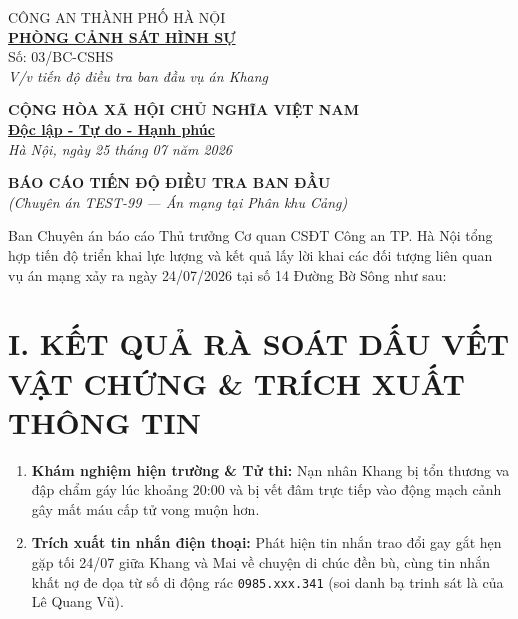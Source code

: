 \documentclass[12pt,a4paper]{article}
\begin{document}
\noindent
\begin{minipage}[t]{0.45\textwidth}
    \begin{center}
        \small
        CÔNG AN THÀNH PHỐ HÀ NỘI\\
        \textbf{\underline{PHÒNG CẢNH SÁT HÌNH SỰ}}\\[0.1cm]
        Số: 03/BC-CSHS\\
        \textit{V/v tiến độ điều tra ban đầu vụ án Khang}
    \end{center}
\end{minipage}
\hfill
\begin{minipage}[t]{0.52\textwidth}
    \begin{center}
        \small
        \textbf{CỘNG HÒA XÃ HỘI CHỦ NGHĨA VIỆT NAM}\\
        \textbf{\underline{Độc lập - Tự do - Hạnh phúc}}\\[0.1cm]
        \textit{Hà Nội, ngày 25 tháng 07 năm 2026}
    \end{center}
\end{minipage}

\vspace{0.6cm}

\begin{center}
    \textbf{\large BÁO CÁO TIẾN ĐỘ ĐIỀU TRA BAN ĐẦU}\\
    \textit{(Chuyên án TEST-99 — Án mạng tại Phân khu Cảng)}
\end{center}

\vspace{0.3cm}

\noindent Ban Chuyên án báo cáo Thủ trưởng Cơ quan CSĐT Công an TP. Hà Nội tổng hợp tiến độ triển khai lực lượng và kết quả lấy lời khai các đối tượng liên quan vụ án mạng xảy ra ngày 24/07/2026 tại số 14 Đường Bờ Sông như sau:

\section*{I. KẾT QUẢ RÀ SOÁT DẤU VẾT VẬT CHỨNG \& TRÍCH XUẤT THÔNG TIN}
\begin{enumerate}[label=\arabic*., leftmargin=1.5cm]
    \item \textbf{Khám nghiệm hiện trường \& Tử thi:} Nạn nhân Khang bị tổn thương va đập chẩm gáy lúc khoảng 20:00 và bị vết đâm trực tiếp vào động mạch cảnh gây mất máu cấp tử vong muộn hơn.
    \item \textbf{Trích xuất tin nhắn điện thoại:} Phát hiện tin nhắn trao đổi gay gắt hẹn gặp tối 24/07 giữa Khang và Mai về chuyện di chúc đền bù, cùng tin nhắn khất nợ đe dọa từ số di động rác \texttt{0985.xxx.341} (soi danh bạ trinh sát là của Lê Quang Vũ).
\end{enumerate}
\end{document}
